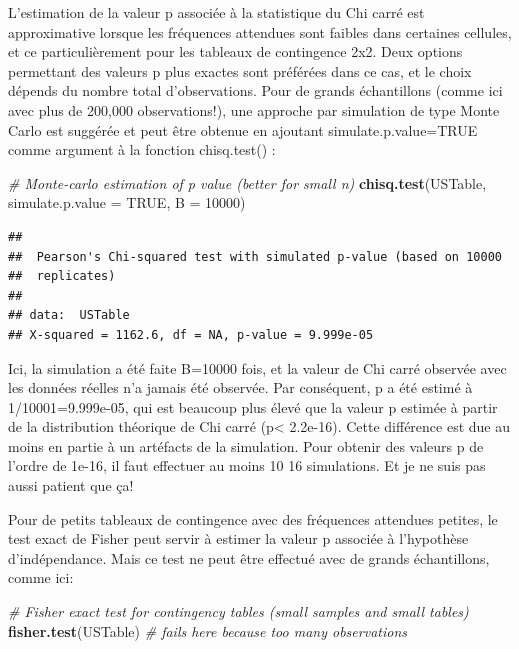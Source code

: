 \documentclass[
  12pt,
]{book}
\newenvironment{Shaded}{\begin{snugshade}}{\end{snugshade}}
\newcommand{\CommentTok}[1]{\textcolor[rgb]{0.56,0.35,0.01}{\textit{#1}}}
\newcommand{\DataTypeTok}[1]{\textcolor[rgb]{0.13,0.29,0.53}{#1}}
\newcommand{\DecValTok}[1]{\textcolor[rgb]{0.00,0.00,0.81}{#1}}
\newcommand{\KeywordTok}[1]{\textcolor[rgb]{0.13,0.29,0.53}{\textbf{#1}}}
\newcommand{\NormalTok}[1]{#1}
\newcommand{\OtherTok}[1]{\textcolor[rgb]{0.56,0.35,0.01}{#1}}
\begin{document}
L'estimation de la valeur p associée à la statistique du Chi carré est approximative lorsque les fréquences attendues sont faibles dans certaines cellules, et ce particulièrement pour les tableaux de contingence 2x2. Deux options permettant des valeurs p plus exactes sont préférées dans ce cas, et le choix dépends du nombre total d'observations. Pour de grands échantillons (comme ici avec plus de 200,000 observations!), une approche par simulation de type Monte Carlo est suggérée et peut être obtenue en ajoutant simulate.p.value=TRUE comme argument à la fonction chisq.test() :

\begin{Shaded}
\begin{Highlighting}[]
\CommentTok{\# Monte{-}carlo estimation of p value (better for small n)}
\KeywordTok{chisq.test}\NormalTok{(USTable, }\DataTypeTok{simulate.p.value =} \OtherTok{TRUE}\NormalTok{, }\DataTypeTok{B =} \DecValTok{10000}\NormalTok{)}
\end{Highlighting}
\end{Shaded}

\begin{verbatim}
## 
##  Pearson's Chi-squared test with simulated p-value (based on 10000
##  replicates)
## 
## data:  USTable
## X-squared = 1162.6, df = NA, p-value = 9.999e-05
\end{verbatim}

Ici, la simulation a été faite B=10000 fois, et la valeur de Chi carré observée avec les données réelles n'a jamais été observée. Par conséquent, p a été estimé à 1/10001=9.999e-05, qui est beaucoup plus élevé que la valeur p estimée à partir de la distribution théorique de Chi carré (p\textless{} 2.2e-16). Cette différence est due au moins en partie à un artéfacts de la simulation. Pour obtenir des valeurs p de l'ordre de 1e-16, il faut effectuer au moins 10 16 simulations. Et je ne suis pas aussi patient que ça!

Pour de petits tableaux de contingence avec des fréquences attendues petites, le test exact de Fisher peut servir à estimer la valeur p associée à l'hypothèse d'indépendance. Mais ce test ne peut être effectué avec de grands échantillons, comme ici:

\begin{Shaded}
\begin{Highlighting}[]
\CommentTok{\# Fisher exact test for contingency tables (small samples and small tables)}
\KeywordTok{fisher.test}\NormalTok{(USTable) }\CommentTok{\# fails here because too many observations}
\end{Highlighting}
\end{Shaded}
\end{document}
